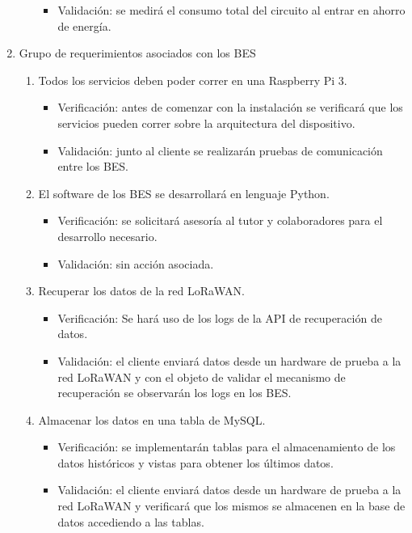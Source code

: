 \documentclass[11pt]{charter}
\begin{document}
\begin{enumerate}
\begin{enumerate}[label*=\arabic*.]
\begin{itemize}
					\item Validación: se medirá el consumo total del circuito al entrar en ahorro de energía.\\
				\end{itemize}
		\end{enumerate}
	\item Grupo de requerimientos asociados con los BES
		\begin{enumerate}[label*=\arabic*.]
			\item Todos los servicios deben poder correr en una Raspberry Pi 3.
			\begin{itemize}
				\item Verificación: antes de comenzar con la instalación se verificará que los servicios pueden correr sobre la arquitectura del dispositivo.\\
				\item Validación: junto al cliente se realizarán pruebas de comunicación entre los BES.\\
			\end{itemize}
			
			\item El software de los BES se desarrollará en lenguaje Python.
			\begin{itemize}
				\item Verificación: se solicitará asesoría al tutor y colaboradores para el desarrollo necesario.\\
				\item Validación: sin acción asociada.\\
			\end{itemize}
			
			\item Recuperar los datos de la red LoRaWAN.
			\begin{itemize}
				\item Verificación: Se hará uso de los logs de la API de recuperación de datos.\\
				\item Validación: el cliente enviará datos desde un hardware de prueba a la red LoRaWAN y con el objeto de validar el mecanismo de recuperación se observarán los logs en los BES.\\
			\end{itemize}

			\item Almacenar los datos en una tabla de MySQL.
			\begin{itemize}
				\item Verificación: se implementarán tablas para el almacenamiento de los datos históricos y vistas para obtener los últimos datos.\\
				\item Validación: el cliente enviará datos desde un hardware de prueba a la red LoRaWAN y verificará que los mismos se almacenen en la base de datos accediendo a las tablas.\\
			\end{itemize}
			

\end{enumerate}
\end{enumerate}
\end{document}
